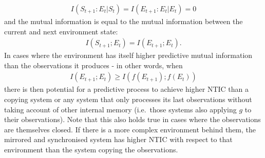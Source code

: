 \documentclass[utf8]{article}
\begin{document}
            \begin{align}
             I(S_{t+1}:E_t|S_t)=I(E_{t+1}:E_t|E_t)=0
            \end{align}
            and the mutual information is equal to the mutual information between the current and next environment state:
            \begin{align}
                I(S_{t+1};E_t)=I(E_{t+1};E_t).
            \end{align}
             In cases where the environment has itself higher predictive mutual information than the observations it produces - in other words, when
             \begin{align}                I(E_{t+1};E_t)\geq I(f(E_{t+1});f(E_t))
            \end{align}
            there is then potential for a predictive process to achieve higher NTIC than a copying system or any system that only processes its last observations without taking account of other internal memory (i.e.\ those systems also applying $g$ to their observations). Note that this also holds true in cases where the observations are themselves closed. If there is a more complex environment behind them, the mirrored and synchronised system has higher NTIC with respect to that environment than the system copying the observations.
\end{document}
